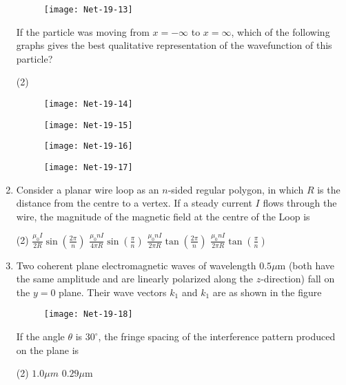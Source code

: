 \begin{enumerate}
\begin{figure}[H]
	\centering
	\texttt{[image: Net-19-13]}
\end{figure}
If the particle was moving from $x=-\infty$ to $x=\infty$, which of the following graphs gives the best qualitative representation of the wavefunction of this particle?
 \begin{tasks}(2)
	\task[\textbf{a.}]
	\begin{figure}[H]
		\centering
		\texttt{[image: Net-19-14]}
	\end{figure}
	\task[\textbf{b.}]
		\begin{figure}[H]
		\centering
		\texttt{[image: Net-19-15]}
	\end{figure}
	\task[\textbf{c.}]
		\begin{figure}[H]
		\centering
		\texttt{[image: Net-19-16]}
	\end{figure}
	\task[\textbf{d.}] 
		\begin{figure}[H]
		\centering
		\texttt{[image: Net-19-17]}
	\end{figure}
\end{tasks}
\item  Consider a planar wire loop as an $n$-sided regular polygon, in which $R$ is the distance from the centre to a vertex. If a steady current $I$ flows through the wire, the magnitude of the magnetic field at the centre of the Loop is
 \begin{tasks}(2)
	\task[\textbf{a.}]$\frac{\mu_{0} I}{2 R} \sin \left(\frac{2 \pi}{n}\right)$
	\task[\textbf{b.}] $\frac{\mu_{0} n I}{4 \pi R} \sin \left(\frac{\pi}{n}\right)$
	\task[\textbf{c.}]$\frac{\mu_{0} n I}{2 \pi R} \tan \left(\frac{2 \pi}{n}\right)$
	\task[\textbf{d.}] $\frac{\mu_{0} n I}{2 \pi R} \tan \left(\frac{\pi}{n}\right)$
\end{tasks}
\item  Two coherent plane electromagnetic waves of wavelength $0.5 \mu \mathrm{m}$ (both have the same amplitude and are linearly polarized along the $z$-direction) fall on the $y=0$ plane. Their wave vectors $k_{1}$ and $k_{1}$ are as shown in the figure
\begin{figure}[H]
	\centering
	\texttt{[image: Net-19-18]}
\end{figure}
If the angle $\theta$ is $30^{\circ}$, the fringe spacing of the interference pattern produced on the plane is
 \begin{tasks}(2)
	\task[\textbf{a.}]$1.0 \mu m$
	\task[\textbf{b.}]$0.29 \mu \mathrm{m}$

\end{tasks}
\end{enumerate}
